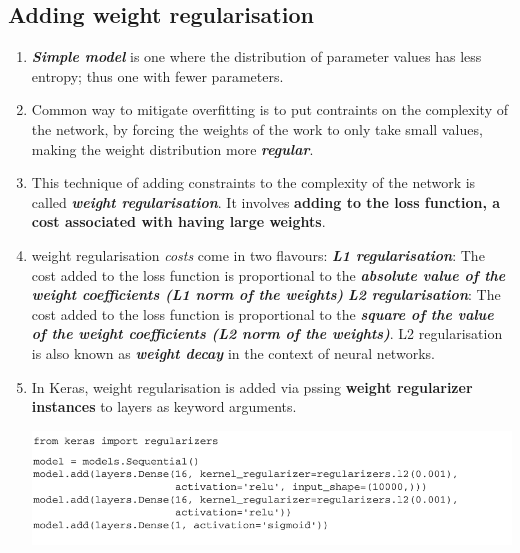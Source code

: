 \documentclass[12pt, a4paper]{article}
\begin{document}
\subsection{Adding weight regularisation}
\begin{enumerate}
   \item \textbf{\textit{Simple model}} is one where the distribution of parameter values has less entropy;
   thus one with fewer parameters.
   \item Common way to mitigate overfitting is to put contraints on the complexity of the network,
   by forcing the weights of the work to only take small values, making the weight distribution more 
   \textbf{\textit{regular}}.
   \item This technique of adding constraints to the complexity of the network is called 
   \textbf{\textit{weight regularisation}}. It involves \textbf{adding to the loss function, a cost associated with having large weights}.
   \item weight regularisation \textit{costs} come in two flavours:
   \subitem \textbf{\textit{L1 regularisation}}: The cost added to the loss function is proportional 
   to the \textbf{\textit{absolute value of the weight coefficients (L1 norm of the weights)}}
   \subitem \textbf{\textit{L2 regularisation}}: The cost added to the loss function is 
   proportional to the \textbf{\textit{square of the value of the weight coefficients (L2 norm of the weights)}}.
   L2 regularisation is also known as \textbf{\textit{weight decay}} in the context of neural networks.

   \item In Keras, weight regularisation is added via pssing \textbf{weight regularizer instances} to layers as keyword arguments.

   {
      \centering
      \includegraphics[width=13cm]{weight_regularizer_instance.png}

   }

\end{enumerate}
\end{document}
